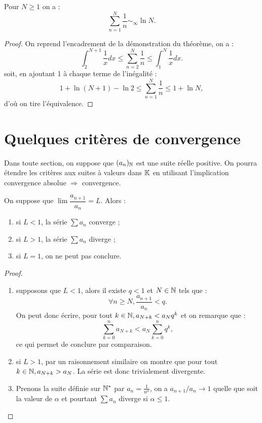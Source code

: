 \documentclass[french]{article}
\begin{document}
\begin{coro}
Pour $N \geq 1$ on a :
\[ \sum_{n=1}^N \dfrac1{n} \sim_{\infty} \ln{N} . \]
\end{coro}

\begin{proof}
On reprend l'encadrement de la démonstration du théorème, on a :
\[ \int_2^{N+1} \dfrac1{x} dx \leq \sum_{n=2}^N \dfrac1{n} \leq \int_1^{N} \dfrac1{x} dx . \]
soit, en ajoutant 1 à chaque terme de l'inégalité :
\[ 1 + \ln(N+1) - \ln{2} \leq \sum_{n=1}^N \dfrac1{n} \leq 1 + \ln{N} , \]
d'où on tire l'équivalence.
\end{proof}

\section{Quelques critères de convergence}

Dans toute section, on suppose que $(a_n)_{\mathbb{N}}$ est une suite réelle positive. 
On pourra étendre les critères aux suites à valeurs dans $\mathbb{K}$ en utilisant l'implication convergence absolue $\Rightarrow$ convergence.

\begin{thm}
On suppose que $\lim \dfrac{a_{n+1}}{a_n} = L$. Alors :
\begin{enumerate}[label=(\roman*)]
\item si $L < 1$, la série $\sum a_n$ converge ;
\item si $L>1$, la série $\sum a_n$ diverge ;
\item si $L=1$, on ne peut pas conclure.
\end{enumerate}
\end{thm}

\begin{proof}
\begin{enumerate}[label=(\roman*)]
\item supposons que $L<1$, alors il existe $q < 1$ et $N \in \mathbb{N}$ tels que :
\[ \forall n \geq N, \dfrac{a_{n+1}}{a_n} < q . \]
On peut donc écrire, pour tout $k \in \mathbb{N}, a_{N+k} < a_N q^k$ et on remarque que :
\[ \sum_{k=0}^n a_{N+k} < a_N \sum_{k=0}^n q^k , \]
ce qui permet de conclure par comparaison.
\item si $L>1$, par un raisonnement similaire on montre que pour tout $k \in \mathbb{N}, a_{N+k} > a_N$. 
La série est donc trivialement divergente.
\item Prenons la suite définie sur $\mathbb{N}^\ast$ par $a_n = \frac1{n^{\alpha}}$, on a $a_{n+1}/a_n \to 1$ quelle que soit la valeur de $\alpha$
et pourtant $\sum a_n$ diverge si $\alpha \leq 1$. 
\end{enumerate}
\end{proof}
\end{document}
